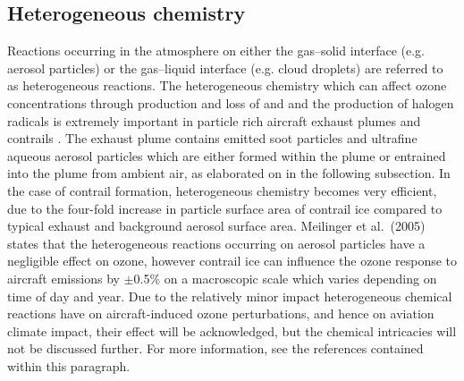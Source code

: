 \subsection{Heterogeneous chemistry}
Reactions occurring in the atmosphere on either the gas--solid interface (e.g. aerosol particles) or the gas--liquid interface (e.g. cloud droplets) are referred to as heterogeneous reactions. The heterogeneous chemistry which can affect ozone concentrations through production and loss of  and  and the production of halogen radicals is extremely important in particle rich aircraft exhaust plumes and contrails \cite{Jacob2000}. The exhaust plume contains emitted soot particles and ultrafine aqueous aerosol particles which are either formed within the plume or entrained into the plume from ambient air, as elaborated on in the following subsection. In the case of contrail formation, heterogeneous chemistry becomes very efficient, due to the four-fold increase in particle surface area of contrail ice compared to typical exhaust and background aerosol surface area. Meilinger et al.\ (2005) \cite{Meilinger2005} states that the heterogeneous reactions occurring on aerosol particles have a negligible effect on ozone, however contrail ice can influence the ozone response to aircraft emissions by $\pm$0.5\% on a macroscopic scale which varies depending on time of day and year. Due to the relatively minor impact heterogeneous chemical reactions have on aircraft-induced ozone perturbations, and hence on aviation climate impact, their effect will be acknowledged, but the chemical intricacies will not be discussed further. For more information, see the references contained within this paragraph. 

